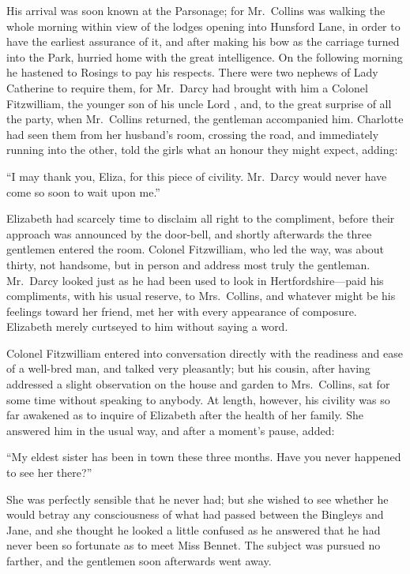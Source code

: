 His arrival was soon known at the Parsonage; for Mr.\ Collins
was walking the whole morning within view of the lodges
opening into Hunsford Lane, in order to have the earliest
assurance of it, and after making his bow as the carriage turned
into the Park, hurried home with the great intelligence.  On the
following morning he hastened to Rosings to pay his respects.
There were two nephews of Lady Catherine to require them, for
Mr.\ Darcy had brought with him a Colonel Fitzwilliam, the
younger son of his uncle Lord \gdash{}, and, to the great surprise
of all the party, when Mr.\ Collins returned, the gentleman
accompanied him.  Charlotte had seen them from her husband's
room, crossing the road, and immediately running into the other,
told the girls what an honour they might expect, adding:

``I may thank you, Eliza, for this piece of civility.  Mr.\ Darcy
would never have come so soon to wait upon me.''

Elizabeth had scarcely time to disclaim all right to the
compliment, before their approach was announced by the
door-bell, and shortly afterwards the three gentlemen entered
the room.  Colonel Fitzwilliam, who led the way, was about
thirty, not handsome, but in person and address most truly the
gentleman.  Mr.\ Darcy looked just as he had been used to look
in Hertfordshire---paid his compliments, with his usual reserve,
to Mrs.\ Collins, and whatever might be his feelings toward her
friend, met her with every appearance of composure.  Elizabeth
merely curtseyed to him without saying a word.

Colonel Fitzwilliam entered into conversation directly with
the readiness and ease of a well-bred man, and talked very
pleasantly; but his cousin, after having addressed a slight
observation on the house and garden to Mrs.\ Collins, sat for
some time without speaking to anybody.  At length, however,
his civility was so far awakened as to inquire of Elizabeth after
the health of her family.  She answered him in the usual way,
and after a moment's pause, added:

``My eldest sister has been in town these three months.  Have
you never happened to see her there?''

She was perfectly sensible that he never had; but she wished
to see whether he would betray any consciousness of what had
passed between the Bingleys and Jane, and she thought he
looked a little confused as he answered that he had never been
so fortunate as to meet Miss Bennet.  The subject was pursued
no farther, and the gentlemen soon afterwards went away.



